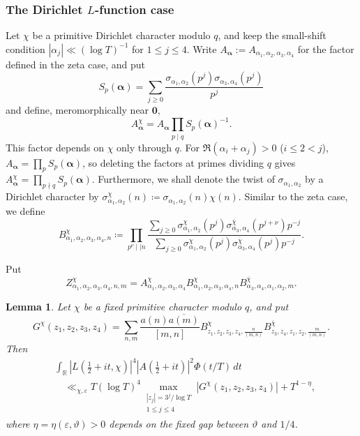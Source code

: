 \documentclass[oneside, 12pt]{amsart}
\newtheorem{lem}[thm]{Lemma}
\theoremstyle{definition}
\begin{document}
	\subsubsection{The Dirichlet $L$-function case}
	{Let $\chi$ be a primitive Dirichlet character modulo
		$q$, and keep the small-shift condition
		$|\alpha_j|\ll(\log T)^{-1}$ for $1\leq j\leq4$. Write
		$A_{\boldsymbol\alpha}:=A_{\alpha_1,\alpha_2,\alpha_3,\alpha_4}$
		for the factor defined in the zeta case, and put
		\[
		S_p(\boldsymbol\alpha)=\sum_{j\geq0}
		\frac{\sigma_{\alpha_1,\alpha_2}(p^j)
			\sigma_{\alpha_3,\alpha_4}(p^j)}{p^j}
		\]
		and define, meromorphically near $\boldsymbol0$,
		\[
		A^{\chi}_{\boldsymbol\alpha}
		=A_{\boldsymbol\alpha}\prod_{p\mid q}
		S_p(\boldsymbol\alpha)^{-1}.
		\]
		This factor depends on $\chi$ only through $q$. For
		$\Re(\alpha_i+\alpha_j)>0$ ($i\leq2<j$),
		$A_{\boldsymbol\alpha}=\prod_p S_p(\boldsymbol\alpha)$, so deleting
		the factors at primes dividing $q$ gives
		$A^\chi_{\boldsymbol\alpha}=\prod_{p\nmid q}S_p(\boldsymbol\alpha)$.}
	Furthermore, we shall denote the twist of $\sigma_{\alpha_1,\alpha_2}$ by a Dirichlet character by $\sigma^{\chi}_{\alpha_1,\alpha_2}(n)\coloneq \sigma_{\alpha_1,\alpha_2}(n)\chi(n)$. Similar to the zeta case, we define $$B^{\chi}_{\alpha_1,\alpha_2,\alpha_3,\alpha_4,n} \coloneq \prod_{p^\nu \mid\mid n} \frac{\sum_{j\geq 0} \sigma^{\chi}_{\alpha_1,\alpha_2}(p^j)\sigma^{\overline{\chi}}_{\alpha_3,\alpha_4}(p^{j+\nu})p^{-j}}{\sum_{j\geq 0} \sigma^{\chi}_{\alpha_1,\alpha_2}(p^j)\sigma^{\overline{\chi}}_{\alpha_3,\alpha_4}(p^{j})p^{-j}}.$$ 
	
	{Put
		\[
		Z^\chi_{\alpha_1,\alpha_2,\alpha_3,\alpha_4,n,m}
		=A^\chi_{\alpha_1,\alpha_2,\alpha_3,\alpha_4}
		B^\chi_{\alpha_1,\alpha_2,\alpha_3,\alpha_4,n}
		B^{\overline\chi}_{\alpha_3,\alpha_4,\alpha_1,\alpha_2,m}.
		\]
	}
	
	\begin{lem}\label{twistedFourthMomentUpperBoundMultiplicativeDirichlet}
		Let $\chi$ be a fixed primitive character modulo $q$, and put
		\[
		G^{\chi}(z_1,z_2,z_3,z_4)
		=\sum_{n,m}\frac{a(n)\overline{a(m)}}{[m,n]}
		B^{\chi}_{z_1,z_2,z_3,z_4,\frac{n}{(m,n)}}
		B^{\overline\chi}_{z_3,z_4,z_1,z_2,\frac{m}{(m,n)}}.
		\]
		Then
		\begin{align*}
			&\int_{\mathbb R}|L(\tfrac12+it,\chi)|^4
			|A(\tfrac12+it)|^2\Phi(t/T)\,dt\\
			&\quad\ll_{\chi,\varepsilon}
			T(\log T)^4
			\max_{\substack{|z_j|=3^j/\log T\\1\leq j\leq4}}
			|G^\chi(z_1,z_2,z_3,z_4)|+T^{1-\eta},
		\end{align*}
		where $\eta=\eta(\varepsilon,\vartheta)>0$ depends on the fixed gap
		between $\vartheta$ and $1/4$.
	\end{lem}
	
\end{document}
